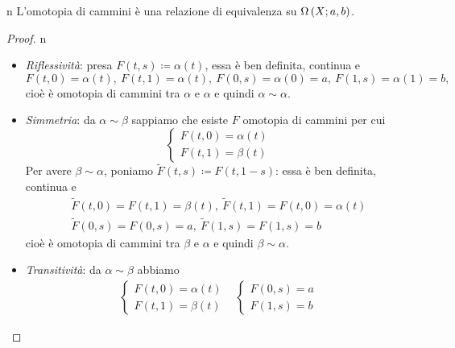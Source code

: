 \begin{remark}{n}
	L'omotopia di cammini è una relazione di equivalenza su $\Omega\left(X; a,b\right)$.
\end{remark}
\begin{proof}{n}~{}
		\begin{itemize}
		\item \textit{Riflessività}: presa $F\left(t,s\right)\coloneqq\alpha\left(t\right)$, essa è ben definita, continua e
		\begin{equation*}
			F\left(t,0\right)=\alpha\left(t\right),\ F\left(t,1\right)=\alpha\left(t\right),\ F\left(0,s\right)=\alpha\left(0\right)=a,\ F\left(1,s\right)=\alpha\left(1\right)=b,
		\end{equation*}
	cioè è omotopia di cammini tra $\alpha$ e $\alpha$ e quindi $\alpha\sim \alpha$.
		\item \textit{Simmetria}: da $\alpha\sim \beta$ sappiamo che esiste $F$ omotopia di cammini per cui
		\begin{equation*}
			\begin{cases}
				F\left(t,0\right)=\alpha\left(t\right)\\
				F\left(t,1\right)=\beta\left(t\right)
			\end{cases}
		\end{equation*}
		Per avere $\beta\sim \alpha$, poniamo $\widetilde{F}\left(t,s\right)\coloneqq F\left(t,1-s\right)$: essa è ben definita, continua e
		\begin{gather*}
			\widetilde{F}\left(t,0\right)=F\left(t,1\right)=\beta\left(t\right),\ \widetilde{F}\left(t,1\right)=F\left(t,0\right)=\alpha\left(t\right)\\
			\widetilde{F}\left(0,s\right)=F\left(0,s\right)=a,\ \widetilde{F}\left(1,s\right)=F\left(1,s\right)=b
		\end{gather*}
		cioè è omotopia di cammini tra $\beta$ e $\alpha$ e quindi $\beta\sim \alpha$.
		\item \textit{Transitività}: da $\alpha\sim \beta$ abbiamo
	\begin{equation*}
			\begin{array}{ll}
			\begin{cases}
				F\left(t,0\right)=\alpha\left(t\right)\\
				F\left(t,1\right)=\beta\left(t\right)
			\end{cases}&
		\begin{cases}
				F\left(0,s\right)=a\\
				F\left(1,s\right)=b
		\end{cases}

\end{array}
\end{equation*}
\end{itemize}
\end{proof}
